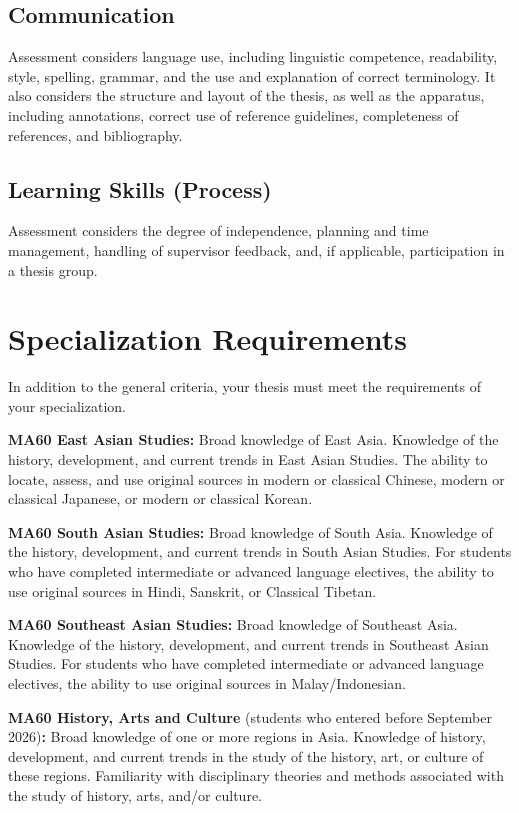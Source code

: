 \documentclass[11pt,a4paper]{article}
\begin{document}
\subsection{Communication}

Assessment considers language use, including linguistic competence, readability, style, spelling, grammar, and the use and explanation of correct terminology. It also considers the structure and layout of the thesis, as well as the apparatus, including annotations, correct use of reference guidelines, completeness of references, and bibliography.

\subsection{Learning Skills (Process)}

Assessment considers the degree of independence, planning and time management, handling of supervisor feedback, and, if applicable, participation in a thesis group.

\section{Specialization Requirements}

In addition to the general criteria, your thesis must meet the requirements of your specialization.

\textbf{MA60 East Asian Studies:} Broad knowledge of East Asia. Knowledge of the history, development, and current trends in East Asian Studies. The ability to locate, assess, and use original sources in modern or classical Chinese, modern or classical Japanese, or modern or classical Korean.

\textbf{MA60 South Asian Studies:} Broad knowledge of South Asia. Knowledge of the history, development, and current trends in South Asian Studies. For students who have completed intermediate or advanced language electives, the ability to use original sources in Hindi, Sanskrit, or Classical Tibetan.

\textbf{MA60 Southeast Asian Studies:} Broad knowledge of Southeast Asia. Knowledge of the history, development, and current trends in Southeast Asian Studies. For students who have completed intermediate or advanced language electives, the ability to use original sources in Malay/Indonesian.

\textbf{MA60 History, Arts and Culture} (students who entered before September 2026)\textbf{:} Broad knowledge of one or more regions in Asia. Knowledge of history, development, and current trends in the study of the history, art, or culture of these regions. Familiarity with disciplinary theories and methods associated with the study of history, arts, and/or culture.
\end{document}
